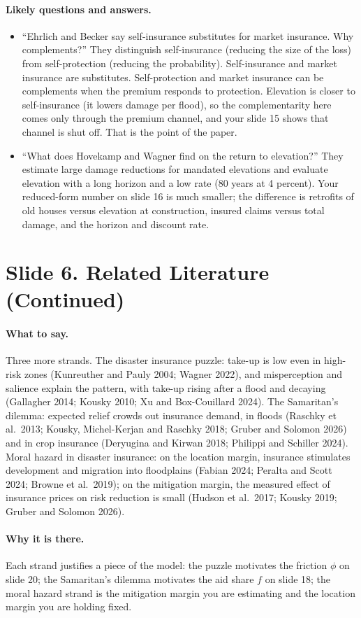 \documentclass[11pt]{article}
\newcommand{\slide}[2]{\section*{Slide #1. #2}\addcontentsline{toc}{section}{Slide #1. #2}}
\newcommand{\say}{\paragraph{What to say.}}
\newcommand{\why}{\paragraph{Why it is there.}}
\newcommand{\qa}{\paragraph{Likely questions and answers.}}
\begin{document}
\qa
\begin{itemize}
\item ``Ehrlich and Becker say self-insurance substitutes for market insurance. Why complements?'' They distinguish self-insurance (reducing the size of the loss) from self-protection (reducing the probability). Self-insurance and market insurance are substitutes. Self-protection and market insurance can be complements when the premium responds to protection. Elevation is closer to self-insurance (it lowers damage per flood), so the complementarity here comes only through the premium channel, and your slide 15 shows that channel is shut off. That is the point of the paper.
\item ``What does Hovekamp and Wagner find on the return to elevation?'' They estimate large damage reductions for mandated elevations and evaluate elevation with a long horizon and a low rate (80 years at 4 percent). Your reduced-form number on slide 16 is much smaller; the difference is retrofits of old houses versus elevation at construction, insured claims versus total damage, and the horizon and discount rate.
\end{itemize}

\slide{6}{Related Literature (Continued)}
\say Three more strands. The disaster insurance puzzle: take-up is low even in high-risk zones (Kunreuther and Pauly 2004; Wagner 2022), and misperception and salience explain the pattern, with take-up rising after a flood and decaying (Gallagher 2014; Kousky 2010; Xu and Box-Couillard 2024). The Samaritan's dilemma: expected relief crowds out insurance demand, in floods (Raschky et al.\ 2013; Kousky, Michel-Kerjan and Raschky 2018; Gruber and Solomon 2026) and in crop insurance (Deryugina and Kirwan 2018; Philippi and Schiller 2024). Moral hazard in disaster insurance: on the location margin, insurance stimulates development and migration into floodplains (Fabian 2024; Peralta and Scott 2024; Browne et al.\ 2019); on the mitigation margin, the measured effect of insurance prices on risk reduction is small (Hudson et al.\ 2017; Kousky 2019; Gruber and Solomon 2026).

\why Each strand justifies a piece of the model: the puzzle motivates the friction $\phi$ on slide 20; the Samaritan's dilemma motivates the aid share $f$ on slide 18; the moral hazard strand is the mitigation margin you are estimating and the location margin you are holding fixed.
\end{document}
